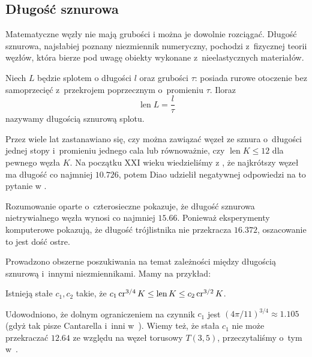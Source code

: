 \subsection{Długość sznurowa}
%
Matematyczne węzły nie mają grubości i można je dowolnie rozciągać.
Długość sznurowa, najsłabiej poznany niezmiennik numeryczny, pochodzi z~fizycznej teorii węzłów, która bierze pod uwagę obiekty wykonane z~nieelastycznych materiałów.

\begin{definition}
    Niech $L$ będzie splotem o długości $l$ oraz grubości $\tau$: posiada rurowe otoczenie bez samoprzecięć z~przekrojem poprzecznym o~promieniu $\tau$.
    Iloraz
    \begin{equation}
        \operatorname{len} L = \frac l \tau
    \end{equation}
    nazywamy długością sznurową splotu.
\end{definition}

Przez wiele lat zastanawiano się, czy można zawiązać węzeł ze sznura o~długości jednej stopy i~promieniu jednego cala lub równoważnie, czy $\operatorname{len} K \le 12$ dla pewnego węzła $K$.
Na początku XXI wieku wiedzieliśmy z \cite{cantarella02}, że najkrótszy węzeł ma długość co najmniej $10.726$, potem Diao udzielił negatywnej odpowiedzi na to pytanie w \cite[s. 14]{diao03}.

Rozumowanie \cite{denne06} oparte o~czterosieczne pokazuje, że długość sznurowa nietrywialnego węzła wynosi co najmniej $15.66$.
Ponieważ eksperymenty komputerowe pokazują, że długość trójlistnika nie przekracza $16.372$, oszacowanie to jest dość ostre.


Prowadzono obszerne poszukiwania na temat zależności między długością sznurową i~innymi niezmiennikami.
Mamy na przykład:

\begin{proposition}
    Istnieją stałe $c_1, c_2$ takie, że $c_1 \operatorname{cr}^{3/4} K \le \operatorname{len} K \le c_2 \operatorname{cr}^{3/2} K$.
\end{proposition}

Udowodniono, że dolnym ograniczeniem na czynnik $c_1$ jest $(4\pi/11)^{3/4} \approx 1.105$ (gdyż tak pisze Cantarella i~inni w~\cite[tw. 23]{cantarella02}).
Wiemy też, że stała $c_1$ nie może przekraczać $12.64$ ze względu na węzeł torusowy $T(3, 5)$, przeczytaliśmy o~tym w~\cite{klotz21}.

